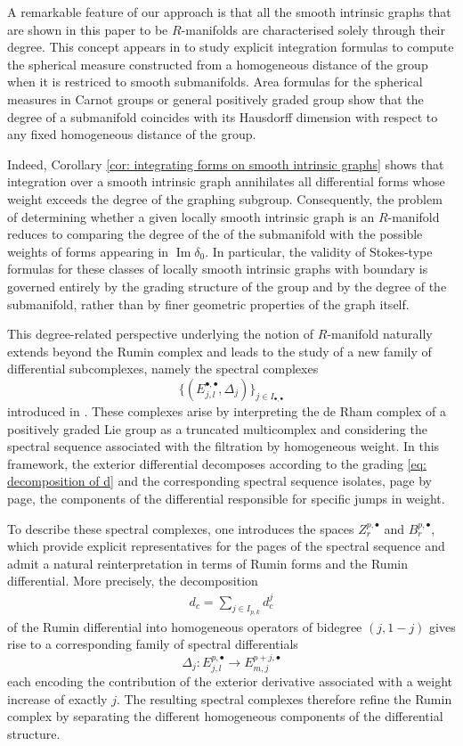 \documentclass[dvipsnames]{amsart}
\theoremstyle{definition}
\theoremstyle{definition}
\numberwithin{equation}{section}
\begin{document}
A remarkable feature of our approach is that all the smooth intrinsic graphs that are shown in this paper to be $R$-manifolds are characterised solely through their degree. This concept appears in \cite{Mag13Vit} to study explicit integration formulas to compute the spherical measure constructed from a homogeneous distance of the group when it is restriced to smooth submanifolds. Area formulas for the spherical measures in Carnot groups or general positively graded group show that the degree of a submanifold coincides with its Hausdorff dimension with respect to
any fixed homogeneous distance of the group.

Indeed, Corollary \ref{cor: integrating forms on smooth intrinsic graphs} shows that integration over a smooth intrinsic graph annihilates all differential forms whose weight exceeds the degree of the graphing subgroup. Consequently, the problem of determining whether a given locally smooth intrinsic graph is an $R$-manifold reduces to comparing the degree of the of the submanifold with the possible weights of forms appearing in $\operatorname{Im}\delta_0$. In particular, the validity of Stokes-type formulas for these classes of locally smooth intrinsic graphs with boundary is governed entirely by the grading structure of the group and by the degree of the submanifold, rather than by finer geometric properties of the graph itself.

This degree-related perspective underlying the notion of $R$-manifold naturally extends beyond the Rumin complex and leads to the study of a new family of differential subcomplexes, namely the spectral complexes
$$\{(E_{j,l}^{\bullet,\bullet},\Delta_j)\}_{j\in I_{\bullet,\bullet}}$$
introduced in \cite{tripaldi2026spectralcomplexestruncatedmulticomplexes}. These complexes arise by interpreting the de Rham complex of a positively graded Lie group as a truncated multicomplex and considering the spectral sequence associated with the filtration by homogeneous weight. In this framework, the exterior differential decomposes according to the grading \eqref{eq: decomposition of d} and the corresponding spectral sequence isolates, page by page, the components of the differential responsible for specific jumps in weight.

To describe these spectral complexes, one introduces the spaces $Z_r^{p,\bullet}$ and $B_r^{p,\bullet}$, which provide explicit representatives for the pages of the spectral sequence and admit a natural reinterpretation in terms of Rumin forms and the Rumin differential. More precisely, the decomposition
\begin{align*}
    d_c=\sum_{j\in I_{p,k}}d_c^j
\end{align*}
of the Rumin differential into homogeneous operators of bidegree $(j,1-j)$ gives rise to a corresponding family of spectral differentials
$$\Delta_j\colon E_{j,l}^{p,\bullet}\longrightarrow E_{m,j}^{p+j,\bullet}$$
each encoding the contribution of the exterior derivative associated with a weight increase of exactly $j$. The resulting spectral complexes therefore refine the Rumin complex by separating the different homogeneous components of the differential structure.
\end{document}
